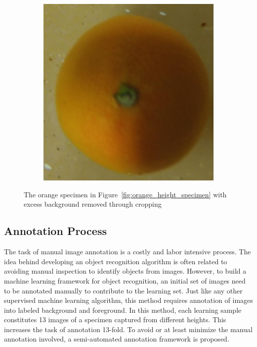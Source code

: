 \documentclass {udthesis}
\begin{document}
\begin{figure}
\begin{subfigure}[]{0.12\textwidth}
      \caption{}
  \end{subfigure}
  \begin{subfigure}[]{0.12\textwidth}
      \includegraphics[width=\textwidth]{orange4_obj_11/orange4_011_08}
      \caption{}
  \end{subfigure}
\caption[Images of an orange specimen after cropping excess background]{The orange specimen in Figure~\ref{fig:orange_height_specimen} with excess background removed through cropping}
\label{fig:orange_height_specimen_cropped}
\end{figure}	


\subsection{Annotation Process}
\label{sec:distdes_annotation}

The task of manual image annotation is a costly and labor intensive process. The idea behind developing an object recognition algorithm is often related to avoiding manual inspection to identify objects from images. However, to build a machine learning framework for object recognition, an initial set of images need to be annotated manually to contribute to the learning set. 
Just like any other supervised machine learning algorithm, this method requires annotation of images into labeled background and foreground. In this method, each learning sample constitutes 13 images of a specimen captured from different heights. This increases the task of annotation 13-fold. To avoid or at least minimize the manual annotation involved, a semi-automated annotation framework is proposed.
\end{document}
